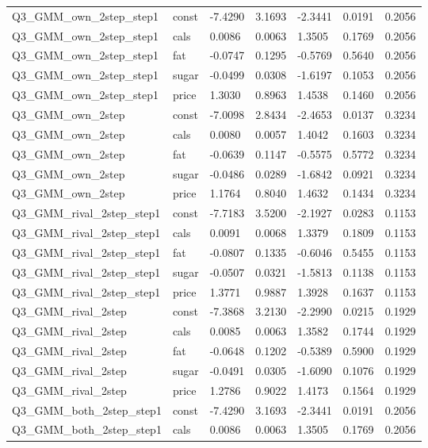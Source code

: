 \begin{table}[!htbp]
\begin{tabular}{lllllll}
Q3\_GMM\_own\_2step\_step1 & const & -7.4290 & 3.1693 & -2.3441 & 0.0191 & 0.2056
\\
Q3\_GMM\_own\_2step\_step1 & cals & 0.0086 & 0.0063 & 1.3505 & 0.1769 & 0.2056
\\
Q3\_GMM\_own\_2step\_step1 & fat & -0.0747 & 0.1295 & -0.5769 & 0.5640 & 0.2056
\\
Q3\_GMM\_own\_2step\_step1 & sugar & -0.0499 & 0.0308 & -1.6197 & 0.1053 & 0.2056
\\
Q3\_GMM\_own\_2step\_step1 & price & 1.3030 & 0.8963 & 1.4538 & 0.1460 & 0.2056
\\
Q3\_GMM\_own\_2step & const & -7.0098 & 2.8434 & -2.4653 & 0.0137 & 0.3234
\\
Q3\_GMM\_own\_2step & cals & 0.0080 & 0.0057 & 1.4042 & 0.1603 & 0.3234
\\
Q3\_GMM\_own\_2step & fat & -0.0639 & 0.1147 & -0.5575 & 0.5772 & 0.3234
\\
Q3\_GMM\_own\_2step & sugar & -0.0486 & 0.0289 & -1.6842 & 0.0921 & 0.3234
\\
Q3\_GMM\_own\_2step & price & 1.1764 & 0.8040 & 1.4632 & 0.1434 & 0.3234
\\
Q3\_GMM\_rival\_2step\_step1 & const & -7.7183 & 3.5200 & -2.1927 & 0.0283 & 0.1153
\\
Q3\_GMM\_rival\_2step\_step1 & cals & 0.0091 & 0.0068 & 1.3379 & 0.1809 & 0.1153
\\
Q3\_GMM\_rival\_2step\_step1 & fat & -0.0807 & 0.1335 & -0.6046 & 0.5455 & 0.1153
\\
Q3\_GMM\_rival\_2step\_step1 & sugar & -0.0507 & 0.0321 & -1.5813 & 0.1138 & 0.1153
\\
Q3\_GMM\_rival\_2step\_step1 & price & 1.3771 & 0.9887 & 1.3928 & 0.1637 & 0.1153
\\
Q3\_GMM\_rival\_2step & const & -7.3868 & 3.2130 & -2.2990 & 0.0215 & 0.1929
\\
Q3\_GMM\_rival\_2step & cals & 0.0085 & 0.0063 & 1.3582 & 0.1744 & 0.1929
\\
Q3\_GMM\_rival\_2step & fat & -0.0648 & 0.1202 & -0.5389 & 0.5900 & 0.1929
\\
Q3\_GMM\_rival\_2step & sugar & -0.0491 & 0.0305 & -1.6090 & 0.1076 & 0.1929
\\
Q3\_GMM\_rival\_2step & price & 1.2786 & 0.9022 & 1.4173 & 0.1564 & 0.1929
\\
Q3\_GMM\_both\_2step\_step1 & const & -7.4290 & 3.1693 & -2.3441 & 0.0191 & 0.2056
\\
Q3\_GMM\_both\_2step\_step1 & cals & 0.0086 & 0.0063 & 1.3505 & 0.1769 & 0.2056

\end{tabular}
\end{table}

